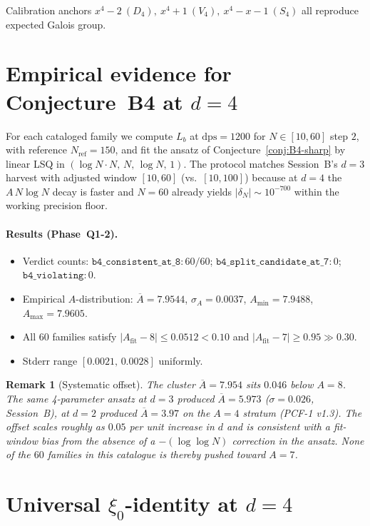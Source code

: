 \documentclass[11pt]{amsart}
\newtheorem{remark}[theorem]{Remark}
\begin{document}
Calibration anchors $x^4-2\ (D_4),\ x^4+1\ (V_4),\ x^4-x-1\ (S_4)$
all reproduce expected Galois group.

\section{Empirical evidence for Conjecture~B4 at $d=4$}

For each cataloged family we compute $L_b$ at $\mathrm{dps}=1200$
for $N\in[10,60]$ step $2$, with reference $N_{\mathrm{ref}}=150$, and
fit the ansatz of Conjecture~\ref{conj:B4-sharp} by linear LSQ in
$(\log N\cdot N,\,N,\,\log N,\,1)$. The protocol matches
Session~B's $d=3$ harvest with adjusted window $[10,60]$ (vs.\ $[10,100]$)
because at $d=4$ the $A\,N\log N$ decay is faster and $N=60$ already
yields $|\delta_N|\sim 10^{-700}$ within the working precision floor.

\paragraph{Results (Phase~Q1-2).}
\begin{itemize}
  \item Verdict counts: $\mathtt{b4\_consistent\_at\_8}: 60/60$;
        $\mathtt{b4\_split\_candidate\_at\_7}: 0$;
        $\mathtt{b4\_violating}: 0$.
  \item Empirical $A$-distribution: $\overline{A}=7.9544$,
        $\sigma_A=0.0037$, $A_{\min}=7.9488$, $A_{\max}=7.9605$.
  \item All $60$ families satisfy $|A_{\mathrm{fit}}-8|\le 0.0512 < 0.10$
        and $|A_{\mathrm{fit}}-7|\ge 0.95\gg 0.30$.
  \item Stderr range $[0.0021,\,0.0028]$ uniformly.
\end{itemize}

\begin{remark}[Systematic offset]\label{rem:offset}
The cluster $\overline{A}=7.954$ sits $0.046$ below $A=8$. The same
4-parameter ansatz at $d=3$ produced $\overline{A}=5.973$
($\sigma=0.026$, Session~B), at $d=2$ produced $\overline{A}=3.97$ on the
$A=4$ stratum (PCF-1 v1.3). The offset scales roughly as $0.05$ per
unit increase in $d$ and is consistent with a fit-window bias from
the absence of a $-(\log\log N)$ correction in the ansatz. None of
the $60$ families in this catalogue is thereby pushed toward $A=7$.
\end{remark}

\section{Universal $\xi_0$-identity at $d=4$}
\end{document}
